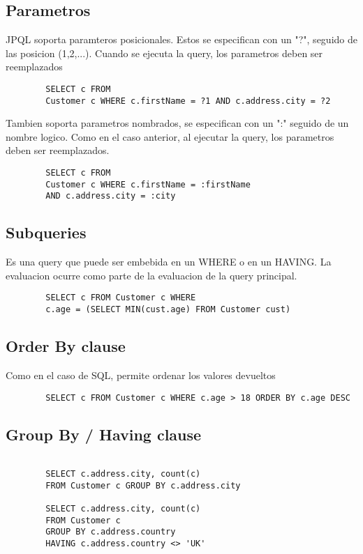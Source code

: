 \documentclass{article}
\begin{document}
\subsection*{Parametros}

JPQL soporta paramteros posicionales. Estos se especifican con un "?", seguido de las posicion (1,2,...). Cuando se ejecuta la query, los parametros deben ser reemplazados

\begin{lstlisting}
        SELECT c FROM 
        Customer c WHERE c.firstName = ?1 AND c.address.city = ?2
    \end{lstlisting}

Tambien soporta parametros nombrados, se especifican con un ":" seguido de un nombre logico. Como en el caso anterior, al ejecutar la query, los parametros deben ser reemplazados.

\begin{lstlisting}
        SELECT c FROM 
        Customer c WHERE c.firstName = :firstName 
        AND c.address.city = :city
    \end{lstlisting}

\subsection*{Subqueries}
Es una query que puede ser embebida en un WHERE o en un HAVING. La evaluacion ocurre como parte de la evaluacion de la query principal.

\begin{lstlisting}
        SELECT c FROM Customer c WHERE 
        c.age = (SELECT MIN(cust.age) FROM Customer cust)
    \end{lstlisting}
\subsection*{Order By clause}
Como en el caso de SQL, permite ordenar los valores devueltos
\begin{lstlisting}
        SELECT c FROM Customer c WHERE c.age > 18 ORDER BY c.age DESC
    \end{lstlisting}

\subsection*{Group By / Having clause}

\begin{lstlisting}
        
        SELECT c.address.city, count(c) 
        FROM Customer c GROUP BY c.address.city

        SELECT c.address.city, count(c)
        FROM Customer c 
        GROUP BY c.address.country 
        HAVING c.address.country <> 'UK'

    \end{lstlisting}
\end{document}
